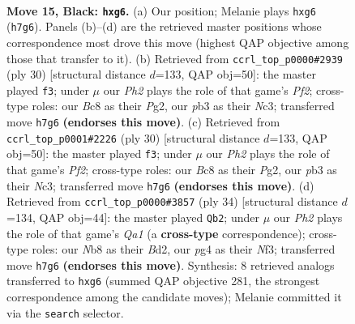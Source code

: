 \documentclass[11pt]{article}
\begin{document}
\begin{figure}[p]
\label{fig:thought-m27}
\end{figure}

\clearpage

\begin{figure}[p]\centering
\begin{subfigure}{0.46\textwidth}\centering
\resizebox{\linewidth}{!}{%
\newchessgame
\chessboard[
  setfen={rnb2rk1/ppp4p/1n2p1P1/3pPp2/1P1P1PP1/1PN5/P7/3QKBNR b K - 0 15},
  showmover=false,
  pgfstyle=straightmove, color=movearrow, markmove={h7-g6}
]}
\caption{}
\end{subfigure}\hfill
\begin{subfigure}{0.46\textwidth}\centering
\resizebox{\linewidth}{!}{%
\newchessgame
\chessboard[
  setfen={r2qkb1R/1p3pp1/p1np1n2/4p3/4P1P1/PNNBB1p1/1PP2PP1/R3K3 w Qq - 1 16},
  showmover=false,
  pgfstyle=straightmove, color=movearrow, markmove={f2-f3}
]}
\caption{}
\end{subfigure}
\\[4pt]
\begin{subfigure}{0.46\textwidth}\centering
\resizebox{\linewidth}{!}{%
\newchessgame
\chessboard[
  setfen={r2qkb1R/1p3pp1/p1np1n2/4p3/4P1P1/PNNBB1p1/1PP2PP1/R3K3 w Qq - 1 16},
  showmover=false,
  pgfstyle=straightmove, color=movearrow, markmove={f2-f3}
]}
\caption{}
\end{subfigure}\hfill
\begin{subfigure}{0.46\textwidth}\centering
\resizebox{\linewidth}{!}{%
\newchessgame
\chessboard[
  setfen={r5k1/1bpqb1pp/3ppn2/1p2p3/1P2P3/2NP1N1P/2PB1PP1/Q3R1K1 w - - 3 18},
  showmover=false,
  pgfstyle=straightmove, color=movearrow, markmove={a1-b2}
]}
\caption{}
\end{subfigure}
\caption{\textbf{Move 15, Black: \texttt{hxg6}.} (a) Our position; Melanie plays \texttt{hxg6} (\texttt{h7g6}). Panels (b)--(d) are the retrieved master positions whose correspondence most drove this move (highest QAP objective among those that transfer to it). (b) Retrieved from \texttt{ccrl\_top\_p0000\#2939} (ply 30) [structural distance $d$=133, QAP obj=50]: the master played \texttt{f3}; under $\mu$ our \emph{Ph2} plays the role of that game's \emph{Pf2}; cross-type roles: our \emph{B}c8 as their \emph{P}g2, our \emph{p}b3 as their \emph{N}c3; transferred move \texttt{h7g6} \textbf{(endorses this move)}. (c) Retrieved from \texttt{ccrl\_top\_p0001\#2226} (ply 30) [structural distance $d$=133, QAP obj=50]: the master played \texttt{f3}; under $\mu$ our \emph{Ph2} plays the role of that game's \emph{Pf2}; cross-type roles: our \emph{B}c8 as their \emph{P}g2, our \emph{p}b3 as their \emph{N}c3; transferred move \texttt{h7g6} \textbf{(endorses this move)}. (d) Retrieved from \texttt{ccrl\_top\_p0000\#3857} (ply 34) [structural distance $d$=134, QAP obj=44]: the master played \texttt{Qb2}; under $\mu$ our \emph{Ph2} plays the role of that game's \emph{Qa1} (a \textbf{cross-type} correspondence); cross-type roles: our \emph{N}b8 as their \emph{B}d2, our \emph{p}g4 as their \emph{N}f3; transferred move \texttt{h7g6} \textbf{(endorses this move)}. Synthesis: 8 retrieved analogs transferred to \texttt{hxg6} (summed QAP objective 281, the strongest correspondence among the candidate moves); Melanie committed it via the \texttt{search} selector.}

\end{figure}
\end{document}
